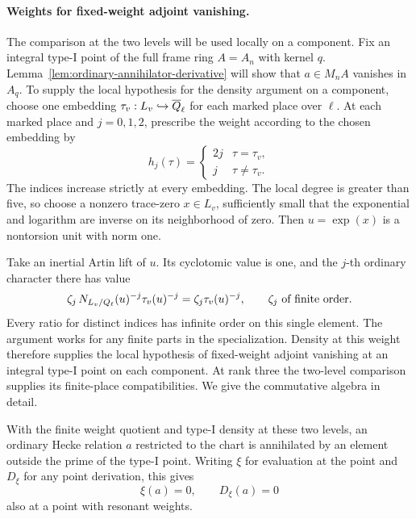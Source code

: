 \paragraph{Weights for fixed-weight adjoint vanishing.}
The comparison at the two levels will be used locally on a component. Fix an integral
type-I point of the full frame ring \(A=A_n\)
with kernel \(q\). Lemma~\ref{lem:ordinary-annihilator-derivative}
will show that \(a\in M_n A\) vanishes in \(A_q\).
To supply the local hypothesis for the density argument on a component,
choose one embedding \(\tau_v:L_v\hookrightarrow\overline{Q}_\ell\)
for each marked place over \(\ell\). At each marked place and \(j=0,1,2\), prescribe the weight according to the chosen embedding by
\[
 h_j(\tau)=\begin{cases}2j&\tau=\tau_v,\\ j&\tau\ne\tau_v.\end{cases}
\] The indices increase strictly at every
embedding. The local degree is greater than five, so choose
a nonzero trace-zero \(x\in L_v\), sufficiently small that
the exponential and logarithm are inverse on its neighborhood
of zero. Then \(u=\exp(x)\) is a nontorsion unit with norm one.

Take an inertial Artin lift of \(u\). Its cyclotomic value is
one, and the \(j\)-th ordinary character there has value
\[
   \zeta_j\,N_{L_v/Q_\ell}(u)^{-j}\tau_v(u)^{-j}
      =\zeta_j\tau_v(u)^{-j},\qquad \zeta_j\ \text{of finite order}.
\]
Every ratio for distinct indices has infinite order on this
single element. The argument works for any finite parts in the
specialization. Density at this weight therefore supplies the
local hypothesis of fixed-weight adjoint vanishing at an
integral type-I point on each component. At
rank three the two-level comparison supplies its finite-place
compatibilities. We give the commutative algebra in detail.

\begin{lemma}
\label{lem:ordinary-annihilator-derivative}
With the finite weight quotient and type-I density at these
two levels, an ordinary Hecke relation \(a\) restricted to the
chart is annihilated by an element outside the prime of the
type-I point. Writing \(\xi\) for evaluation at the point and \(D_\xi\) for any
point derivation, this gives
\[
                      \xi(a)=0,\qquad D_\xi(a)=0
\]
also at a point with resonant weights.
\end{lemma}

